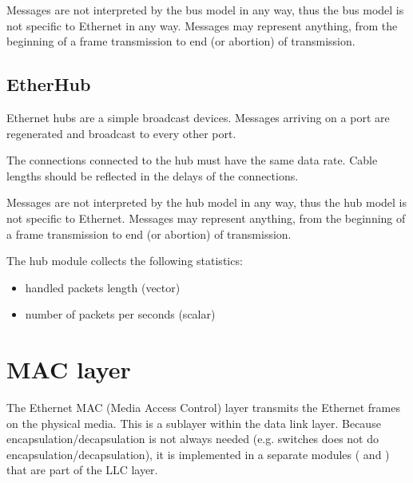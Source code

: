 Messages are not interpreted by the bus model in any way, thus the bus
model is not specific to Ethernet in any way. Messages may
represent anything, from the beginning of a frame transmission to
end (or abortion) of transmission.


\subsection{EtherHub}

Ethernet hubs are a simple broadcast devices. Messages arriving on a port
are regenerated and broadcast to every other port.

The connections connected to the hub must have the same data rate.
Cable lengths should be reflected in the delays of the connections.

Messages are not interpreted by the  hub model in any way,
thus the hub model is not specific to Ethernet. Messages may
represent anything, from the beginning of a frame transmission to
end (or abortion) of transmission.

The hub module collects the following statistics:

\begin{itemize}
\item {} handled packets length (vector)
\item {} number of packets per seconds (scalar)
\end{itemize}


\section{MAC layer}

The Ethernet MAC (Media Access Control) layer transmits the Ethernet frames on
the physical media. This is a sublayer within the data link layer. Because
encapsulation/decapsulation is not always needed (e.g. switches does not do
encapsulation/decapsulation), it is implemented in a separate modules
( and ) that are part of the LLC layer.

